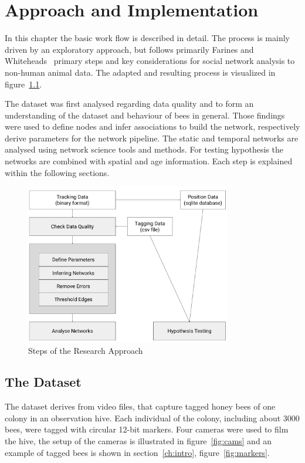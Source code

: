 \chapter{Approach and Implementation}
\label{ch:approach}
In this chapter the basic work flow is described in detail. The process is mainly driven by an exploratory approach, but follows primarily Farines and Whiteheads~\cite{farine2015constructing} primary steps and key considerations for social network analysis to non-human animal data. The adapted and resulting process is visualized in figure~\ref{fig:process}.

The dataset was first analysed regarding data quality and to form an understanding of the dataset and behaviour of bees in general. Those findings were used to define nodes and infer associations to build the network, respectively derive parameters for the network pipeline. The static and temporal networks are analysed using network science tools and methods. For testing hypothesis the networks are combined with spatial and age information. Each step is explained within the following sections.

\begin{figure}[htb]
	\centering
	\includegraphics[width=0.8\textwidth]{Figures/process}
	\caption{Steps of the Research Approach}
	\label{fig:process}
\end{figure}


\section{The Dataset}
\label{sec:dataset}
The dataset derives from video files, that capture tagged honey bees of one colony in an observation hive.
Each individual of the colony, including about 3000 bees, were tagged with circular 12-bit markers. Four cameras were used to film the hive, the setup of the cameras is illustrated in figure~\ref{fig:cams} and an example of tagged bees is shown in section~\ref{ch:intro}, figure~\ref{fig:markers}.

